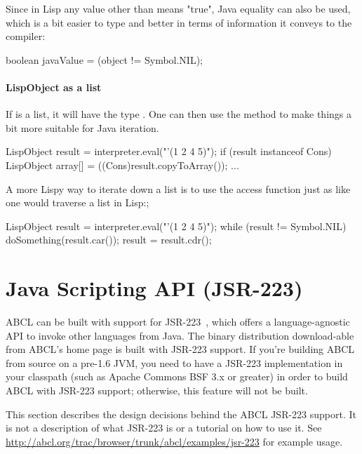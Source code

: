 \documentclass[10pt]{book}
\begin{document}
Since in Lisp any value other than  means "true", Java
equality can also be used, which is a bit easier to type and better in
terms of information it conveys to the compiler:

\begin{listing-java}
    boolean javaValue = (object != Symbol.NIL);
\end{listing-java}

\paragraph{LispObject as a list}

If  is a list, it will have the type .  One
can then use the  method to make things a bit more
suitable for Java iteration.

\begin{listing-java}
  LispObject result = interpreter.eval("'(1 2 4 5)");
  if (result instanceof Cons) {
    LispObject array[] = ((Cons)result.copyToArray());
    ...
  }
\end{listing-java}

A more Lispy way to iterate down a list is to use the  access
function just as like one would traverse a list in Lisp:;

\begin{listing-java}
  LispObject result = interpreter.eval("'(1 2 4 5)");
  while (result != Symbol.NIL) {
    doSomething(result.car());
    result = result.cdr();
  }
\end{listing-java}

\section{Java Scripting API (JSR-223)}
\label{section:java-scripting-api}

ABCL can be built with support for JSR-223~\cite{jsr-223}, which offers
a language-agnostic API to invoke other languages from Java. The binary
distribution download-able from ABCL's home page is built with JSR-223
support. If you're building ABCL from source on a pre-1.6 JVM, you need
to have a JSR-223 implementation in your classpath (such as Apache
Commons BSF 3.x or greater) in order to build ABCL with JSR-223 support;
otherwise, this feature will not be built.

This section describes the design decisions behind the ABCL JSR-223
support. It is not a description of what JSR-223 is or a tutorial on
how to use it. See
\url{http://abcl.org/trac/browser/trunk/abcl/examples/jsr-223}
for example usage.
\end{document}
